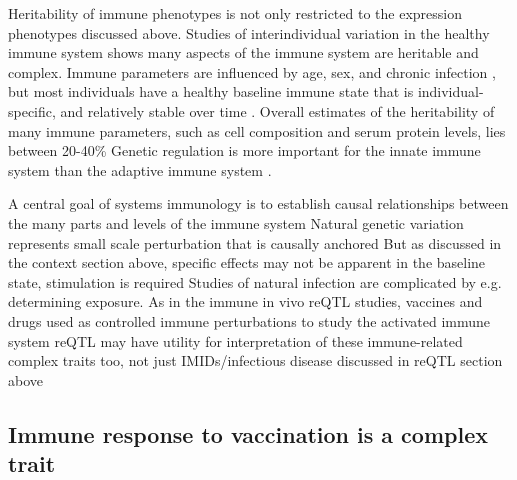 \begin{outline}
\1 Heritability of immune phenotypes is not only restricted to the expression phenotypes discussed above.
    \2 Studies of interindividual variation in the healthy immune system shows many aspects of the immune system are heritable and complex.
    \2 Immune parameters are influenced by age, sex, and chronic infection \autocite{brodin2015VariationHumanImmune,liston2016ShapingVariationHuman,brodin2017HumanImmuneSystem,patin2018NaturalVariationParameters,liston2018OriginsDiversityHuman},
    but most individuals have a healthy baseline immune state that is individual-specific, 
    and relatively stable over time \autocite{liston2016ShapingVariationHuman,brodin2017HumanImmuneSystem,lakshmikanth2020HumanImmuneSystem}.
    \2 Overall estimates of the heritability of many immune parameters, such as cell composition and serum protein levels, lies between 20-40\% \autocite{liston2016ShapingVariationHuman,brodin2017HumanImmuneSystem,patin2018NaturalVariationParameters,liston2018OriginsDiversityHuman}
    \2 Genetic regulation is more important for the innate immune system than the adaptive immune system \autocite{patin2018NaturalVariationParameters}.

\1 A central goal of systems immunology is to establish causal relationships between the many parts and levels of the immune system
    \2 Natural genetic variation represents small scale perturbation that is causally anchored \autocite{tsang2015UtilizingPopulationVariation,villani2018SystemsImmunologyLearning}
    \2 But as discussed in the context section above, specific effects may not be apparent in the baseline state, stimulation is required
    \2 Studies of natural infection are complicated by e.g. determining exposure.
    \2 As in the immune in vivo reQTL studies, vaccines and drugs used as controlled immune perturbations to study the activated immune system
    \2 reQTL may have utility for interpretation of these immune-related complex traits too, not just IMIDs/infectious disease discussed in reQTL section above

\subsection{Immune response to vaccination is a complex trait}


\end{outline}
